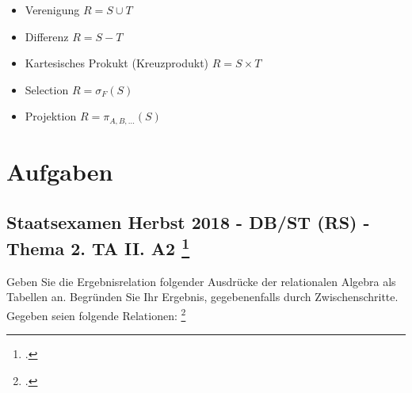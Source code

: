 \documentclass{lehramt-informatik}
\begin{document}
\begin{itemize}
\item Verenigung $R = S \cup T$
\item Differenz $R = S - T$
\item Kartesisches Prokukt (Kreuzprodukt) $R = S \times T$
\item Selection $R = \sigma_F(S)$
\item Projektion $R = \pi_{A,B,...}(S)$
\end{itemize}


\chapter{Aufgaben}

%

\section{Staatsexamen Herbst 2018 - DB/ST (RS) - Thema 2. TA II. A2
\footcite[Herbst 2018 - DB/ST (RS) - Thema 2. TA II. A2]{examen:46116:2018:09}}

Geben Sie die Ergebnisrelation folgender Ausdrücke der relationalen
Algebra als Tabellen an. Begründen Sie Ihr Ergebnis, gegebenenfalls
durch Zwischenschritte. Gegeben seien folgende Relationen:
\footcite[Seite 1, Aufgabe 1: Herbst 2018 - DB/ST (RS) - Thema 2. TA II. A2]{db:ab:3}

\bigskip
\end{document}
